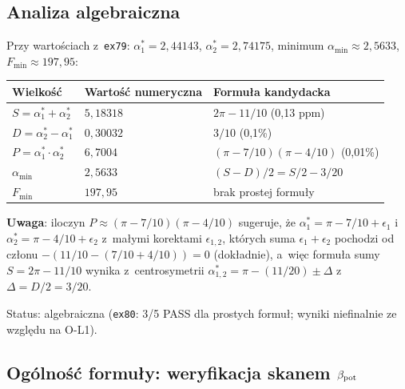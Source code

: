 \subsection{Analiza algebraiczna}
\label{app:L-algebra}

\begin{result}%
\label{res:L-algebra}
Przy wartościach z~\texttt{ex79}: $\alpha^*_1 = 2{,}44143$,
$\alpha^*_2 = 2{,}74175$, minimum $\alpha_{\min} \approx 2{,}5633$,
$F_{\min} \approx 197{,}95$:
\begin{center}\footnotesize
\begin{tabular}{@{}lll@{}}
\toprule
\textbf{Wielkość} & \textbf{Wartość numeryczna} & \textbf{Formuła kandydacka} \\
\midrule
$S = \alpha^*_1 + \alpha^*_2$ & $5{,}18318$ & $2\pi - 11/10$ (0{,}13 ppm) \\
$D = \alpha^*_2 - \alpha^*_1$ & $0{,}30032$ & $3/10$ (0{,}1\%) \\
$P = \alpha^*_1 \cdot \alpha^*_2$ & $6{,}7004$ & $(\pi - 7/10)(\pi - 4/10)$ (0{,}01\%) \\
$\alpha_{\min}$    & $2{,}5633$  & $(S-D)/2 = S/2 - 3/20$ \\
$F_{\min}$         & $197{,}95$  & brak prostej formuły \\
\bottomrule
\end{tabular}
\end{center}

\textbf{Uwaga}: iloczyn $P \approx (\pi-7/10)(\pi-4/10)$ sugeruje,
że $\alpha^*_1 = \pi - 7/10 + \epsilon_1$ i~$\alpha^*_2 = \pi - 4/10 + \epsilon_2$
z~małymi korektami $\epsilon_{1,2}$, których suma $\epsilon_1 + \epsilon_2$
pochodzi od członu $-(11/10 - (7/10 + 4/10)) = 0$ (dokładnie),
a~więc formuła sumy $S = 2\pi - 11/10$ wynika z~centrosymetrii
$\alpha^*_{1,2} = \pi - (11/20) \pm \Delta$ z~$\Delta = D/2 = 3/20$.

Status:  algebraiczna (\texttt{ex80}: 3/5 PASS dla prostych
formuł; wyniki niefinalnie ze względu na O-L1).
\end{result}

\subsection{Ogólność formuły: weryfikacja skanem $\beta_{\rm pot}$}
\label{app:L-generalnosc}

